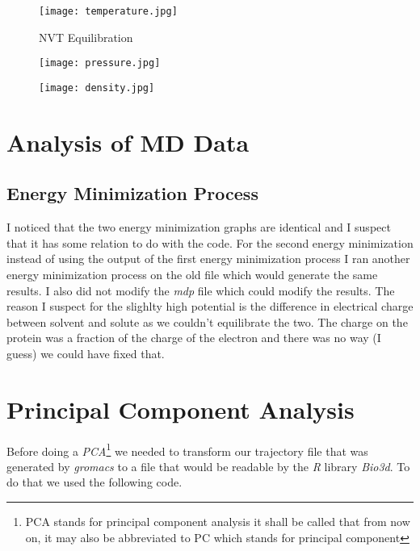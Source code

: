 \documentclass{article}
\begin{document}
  \begin{figure}[H]
     \centering
     \texttt{[image: temperature.jpg]}
     \caption{NVT Equilibration}
     \label{fig:temp}
 \end{figure}
 \begin{figure}[H]
    \begin{minipage}{.5\textwidth}
          \centering
          \texttt{[image: pressure.jpg]}
          \label{fig:prs}
    \end{minipage}%
    \begin{minipage}{.5\textwidth}
          \centering
          \texttt{[image: density.jpg]}
          \label{fig:dens}
    \end{minipage}
\end{figure}

 
 \section{Analysis of MD Data}
 \label{analMD}
 \subsection{Energy Minimization Process}
 	I noticed that the two energy minimization graphs are identical and I suspect that it has some relation to do with the code. For the second energy minimization instead of using the output of the first energy minimization process I ran another energy minimization process on the old file which would generate the same results. I also did not modify the \emph{mdp} file which could modify the results. The reason I suspect for the slighlty high potential is the difference in electrical charge between solvent and solute as we couldn't equilibrate the two. The charge on the protein was a fraction of the charge of the electron and there was no way (I guess) we could have fixed that.

 \section{Principal Component Analysis}
 \label{pca}
 Before doing a \emph{PCA}\footnote{PCA stands for principal component analysis it shall be called that from now on, it may also be abbreviated to PC which stands for principal component} we needed to transform our trajectory file that was generated by \emph{gromacs} to a file that would be readable by the \emph{R} library \emph{Bio3d}. To do that we used the following code.
 
\end{document}
